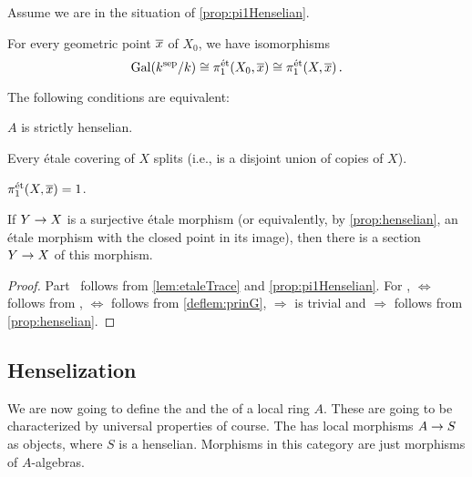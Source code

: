 \begin{cor}
	Assume we are in the situation of \cref{prop:pi1Henselian}.
	\begin{alphanumerate}
		\item For every geometric point $\ov{x}$ of $X_0$, we have isomorphisms
		\begin{equation*}
			\Gal(k^\sep/k)\cong \pi_1^\et(X_0,\ov{x})\cong \pi_1^\et(X,\ov{x})\,.
		\end{equation*}
		\item The following conditions are equivalent:
		\begin{numerate}
			\item $A$ is strictly henselian.
			\item Every étale covering of $X$ splits (i.e., is a disjoint union of copies of $X$).
			\item $\pi_1^\et(X,\ov{x})=1$.
			\item If $Y\morphism X$ is a surjective étale morphism (or equivalently, by \cref{prop:henselian}, an étale morphism with the closed point in its image), then there is a section $Y\morphism X$ of this morphism.
		\end{numerate}
	\end{alphanumerate}
\end{cor}
\begin{proof}
	Part~ follows from \cref{lem:etaleTrace} and \cref{prop:pi1Henselian}. For ,  $\Leftrightarrow$  follows from ,  $\Leftrightarrow$  follows from \cref{deflem:prinG},  $\Rightarrow$  is trivial and  $\Rightarrow$  follows from \cref{prop:henselian}.
\end{proof}
\subsection{Henselization}
We are now going to define the  and the  of a local ring $A$. These are going to be characterized by universal properties of course. The  has local morphisms $A\morphism S$ as objects, where $S$ is a henselian. Morphisms in this category are just morphisms of $A$-algebras.

